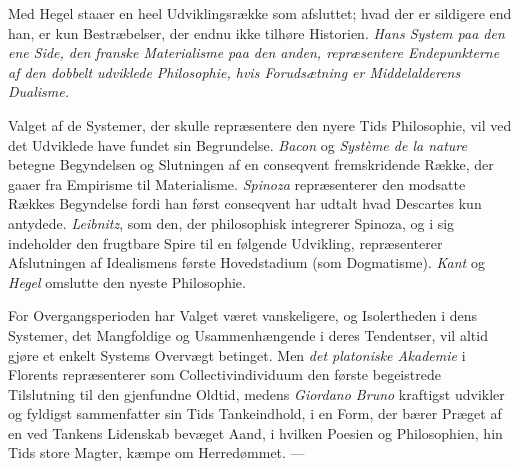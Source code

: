 \documentclass[12pt,a4paper]{book}
\newcommand{\opage}[1]{\marginnote{\footnotesize\textit{[#1]}}}
\begin{document}
Med Hegel staaer en heel Udviklingsrække som afsluttet; hvad der er
sildigere end han, er kun Bestræbelser, der endnu ikke tilhøre
Historien. \emph{Hans System paa den ene Side, den franske
Materialisme paa den anden, repræsentere Endepunkterne af den dobbelt
udviklede Philosophie, hvis Forudsætning er Middelalderens Dualisme.}

Valget af de Systemer, der skulle repræsentere den nyere Tids
Philosophie, vil ved det Udviklede have fundet sin Begrundelse.
\emph{Bacon} og \emph{Système de la nature} betegne Begyndelsen og
Slutningen af en conseqvent fremskridende Række, der gaaer fra
Empirisme til Materialisme. \emph{Spinoza} repræsenterer den modsatte
Rækkes Begyndelse fordi han først conseqvent har udtalt hvad Descartes
kun antydede. \emph{Leibnitz}, som den, der philosophisk integrerer
Spinoza, og i sig indeholder den frugtbare Spire til en følgende
Udvikling, repræsenterer Afslutningen af Idealismens
\opage{12} første Hovedstadium (som Dogmatisme). \emph{Kant} og \emph{Hegel}
omslutte den nyeste Philosophie.

For Overgangsperioden har Valget været vanskeligere, og Isolertheden i
dens Systemer, det Mangfoldige og Usammenhængende i deres Tendentser,
vil altid gjøre et enkelt Systems Overvægt betinget. Men \emph{det
platoniske Akademie} i Florents repræsenterer som Collectivindividuum
den første begeistrede Tilslutning til den gjenfundne Oldtid, medens
\emph{Giordano Bruno} kraftigst udvikler og fyldigst sammenfatter sin
Tids Tankeindhold, i en Form, der bærer Præget af en ved Tankens
Lidenskab bevæget Aand, i hvilken Poesien og Philosophien, hin Tids
store Magter, kæmpe om Herredømmet. ---
\end{document}
